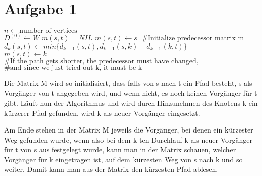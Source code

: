 \documentclass{article}
\begin{document}
\section*{Aufgabe 1}

\begin{algorithm}
\begin{algorithmic}[5]

\State $ n \gets \text{number of vertices}$ \\
\State $D^{(0)} \gets W$ 
\State $m(s,t) = NIL$
\Else  
\State $m(s,t) \gets s$
\State $\text{ \#Initialize predecessor matrix m}$
\EndIf
\EndFor
\EndFor
{}
\State $d_k(s,t) \gets min\{d_{k-1}(s,t), d_{k-1}(s,k) + d_{k-1}(k,t)\}$\\
\State $m(s,t) \gets k$ \\
\State $\text{\# If the path gets shorter, the predecessor must have changed,}$
\State $\text{\# and since we just tried out k, it must be k}$
\EndIf
\EndFor
\EndFor
\EndFor


\EndFunction

\end{algorithmic}
\end{algorithm}

Die Matrix M wird so initialisiert, dass falls von s nach t ein Pfad 
besteht, s als Vorgänger von t angegeben wird, und wenn nicht, es noch 
keinen Vorgänger für t gibt. 
Läuft nun der Algorithmus und wird durch Hinzunehmen des Knotens k ein 
kürzerer Pfad gefunden, wird k als neuer Vorgänger eingesetzt. 

Am Ende stehen in der Matrix M jeweils die Vorgänger, bei denen ein 
kürzester Weg gefunden wurde, wenn also bei dem k-ten Durchlauf k als 
neuer Vorgänger für t von s aus festgelegt wurde, kann man in der 
Matrix schauen, welcher Vorgänger für k eingetragen ist, auf dem 
kürzesten Weg von s nach k und so weiter. Damit kann man aus der Matrix den kürzesten 
Pfad ablesen. 
\end{document}
